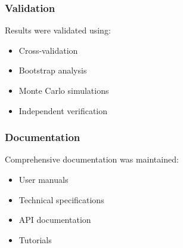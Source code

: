 \subsubsection{Validation}
Results were validated using:
\begin{itemize}
    \item Cross-validation
    \item Bootstrap analysis
    \item Monte Carlo simulations
    \item Independent verification
\end{itemize}

\subsubsection{Documentation}
Comprehensive documentation was maintained:
\begin{itemize}
    \item User manuals
    \item Technical specifications
    \item API documentation
    \item Tutorials
\end{itemize}
